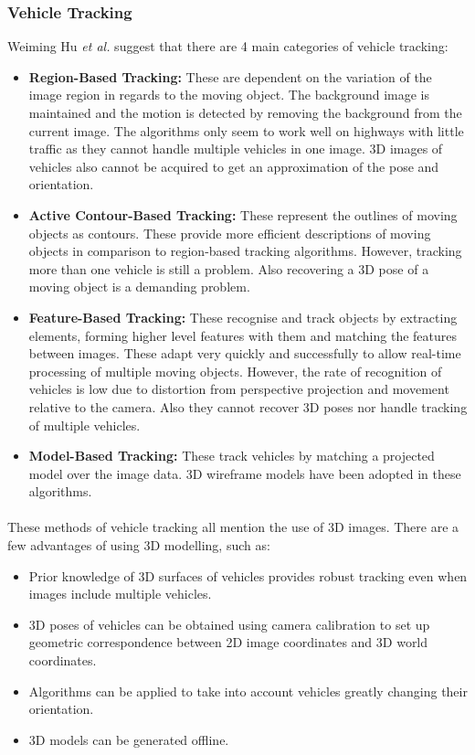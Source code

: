 \documentclass[a4paper]{report}
\begin{document}
\subsubsection{Vehicle Tracking}
{Weiming Hu \textit{et al.} \cite{prediction_3D_vehicle_tracking} suggest that there are 4 main categories of vehicle tracking:
\begin{itemize}
\item \textbf{Region-Based Tracking:} These are dependent on the variation of the image region in regards to the moving object. The background image is maintained and the motion is detected by removing the background from the current image. The algorithms only seem to work well on highways with little traffic as they cannot handle multiple vehicles in one image. 3D images of vehicles also cannot be acquired to get an approximation of the pose and orientation. 
\item \textbf{Active Contour-Based Tracking:} These represent the outlines of moving objects as contours. These provide more efficient descriptions of moving objects in comparison to region-based tracking algorithms. However, tracking more than one vehicle is still a problem. Also recovering a 3D pose of a moving object is a demanding problem. 
\item \textbf{Feature-Based Tracking:} These recognise and track objects by extracting elements, forming higher level features with them and matching the features between images. These adapt very quickly and successfully to allow real-time processing of multiple moving objects. However, the rate of recognition of vehicles is low due to distortion from perspective projection and movement relative to the camera. Also they cannot recover 3D poses nor handle tracking of multiple vehicles.
\item \textbf{Model-Based Tracking:} These track vehicles by matching a projected model over the image data. 3D wireframe models have been adopted in these algorithms.
\end{itemize}

\paragraph{}These methods of vehicle tracking all mention the use of 3D images. There are a few advantages of using 3D modelling, such as:
\begin{itemize}
\item Prior knowledge of 3D surfaces of vehicles provides robust tracking even when images include multiple vehicles.
\item 3D poses of vehicles can be obtained using camera calibration to set up geometric correspondence between 2D image coordinates and 3D world coordinates. 
\item Algorithms can be applied to take into account vehicles greatly changing their orientation.
\item 3D models can be generated offline.
\end{itemize}
}
\end{document}
